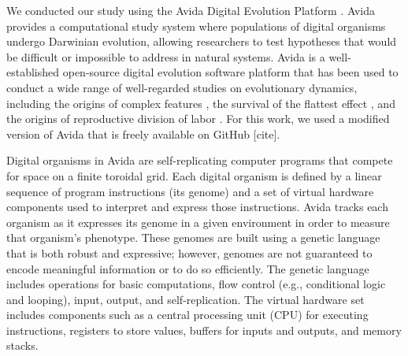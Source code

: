 



We conducted our study using the Avida Digital Evolution Platform \citep{ofria_avida:_2009}. 
Avida provides a computational study system where populations of digital organisms undergo Darwinian evolution, allowing researchers to test hypotheses that would be difficult or impossible to address in natural systems.
Avida is a well-established open-source digital evolution software platform that has been used to conduct a wide range of well-regarded studies on evolutionary dynamics, including 
the origins of complex features \citep{lenski_evolutionary_2003},
the survival of the flattest effect \citep{wilke_evolution_2001},
and the origins of reproductive division of labor \citep{goldsby_evolutionary_2014}.
For this work, we used a modified version of Avida that is freely available on GitHub [cite].

Digital organisms in Avida are self-replicating computer programs that compete for space on a finite toroidal grid.
Each digital organism is defined by a linear sequence of program instructions (its genome) and a set of virtual hardware components used to interpret and express those instructions.
Avida tracks each organism as it expresses its genome in a given environment in order to measure that organism's phenotype.
These genomes are built using a genetic language that is both robust and expressive; however, genomes are not guaranteed to encode meaningful information or to do so efficiently.
The genetic language includes operations for basic computations, flow control (e.g., conditional logic and looping), input, output, and self-replication.
The virtual hardware set includes components such as a central processing unit (CPU) for executing instructions, registers to store values, buffers for inputs and outputs, and memory stacks.


